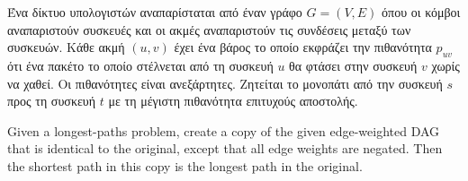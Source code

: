 \begin{problem}
	\label{problem_1}
	Ένα δίκτυο υπολογιστών αναπαρίσταται από έναν γράφο $G = (V, E)$ όπου οι κόμβοι αναπαριστούν συσκευές και οι ακμές αναπαριστούν τις συνδέσεις μεταξύ των συσκευών. Κάθε ακμή $(u, v)$ έχει ένα βάρος το οποίο εκφράζει την πιθανότητα $p_{uv}$ ότι ένα πακέτο το οποίο στέλνεται από τη συσκευή $u$ θα φτάσει στην συσκευή $v$ χωρίς να χαθεί. Οι πιθανότητες είναι ανεξάρτητες. Ζητείται το μονοπάτι από την συσκευή $s$ προς τη συσκευή $t$ με τη μέγιστη πιθανότητα επιτυχούς αποστολής.
\end{problem}

\begin{proposition}
	\label{proposition_1}
	Given a longest-paths problem, create a copy of the given edge-weighted DAG that is identical to the original, except that all edge weights are negated. Then the shortest path in this copy is the longest path in the original.
\end{proposition}

